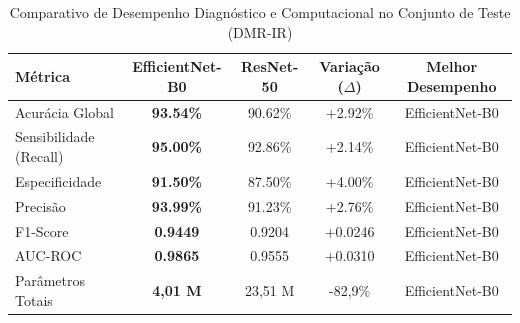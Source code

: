 \begin{table}[htbp]
\centering
\caption{Comparativo de Desempenho Diagnóstico e Computacional no Conjunto de Teste (DMR-IR)}
\label{tab:metricas_modelos}
\begin{tabular}{lcccc}
\hline
\textbf{Métrica} & \textbf{EfficientNet-B0} & \textbf{ResNet-50} & \textbf{Variação ($\Delta$)} & \textbf{Melhor Desempenho} \\
\hline
Acurácia Global        & \textbf{93.54\%} & 90.62\% & +2.92\%   & EfficientNet-B0 \\
Sensibilidade (Recall) & \textbf{95.00\%} & 92.86\% & +2.14\%   & EfficientNet-B0 \\
Especificidade         & \textbf{91.50\%} & 87.50\% & +4.00\%   & EfficientNet-B0 \\
Precisão               & \textbf{93.99\%} & 91.23\% & +2.76\%   & EfficientNet-B0 \\
F1-Score               & \textbf{0.9449}        & 0.9204        & +0.0246        & EfficientNet-B0 \\
AUC-ROC                & \textbf{0.9865}         & 0.9555         & +0.0310        & EfficientNet-B0 \\
Parâmetros Totais      & \textbf{4,01 M}                               & 23,51 M                               & -82,9\%           & EfficientNet-B0 \\
\hline
\end{tabular}
\end{table}
